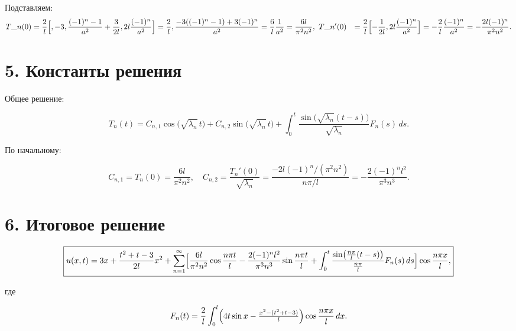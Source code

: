 \documentclass[a4paper,12pt]{article}
\begin{document}
Подставляем: \begin{align*} T\_n(0)&=\frac{2}{l}\Bigl[,-3,\frac{(-1)^n-1}{a^2} +\frac{3}{2l},2l\frac{(-1)^n}{a^2}\Bigr] =\frac{2}{l},\frac{-3((-1)^n-1)+3(-1)^n}{a^2} =\frac{6}{l}\frac{1}{a^2} =\frac{6l}{\pi^2n^2},\ T\_n'(0)&=\frac{2}{l}\Bigl[-\frac{1}{2l},2l\frac{(-1)^n}{a^2}\Bigr] =-\frac{2}{l}\frac{(-1)^n}{a^2} =-\frac{2l(-1)^n}{\pi^2n^2}. \end{align*}

\section*{5. Константы решения} Общее решение:

$$
  T_n(t)=C_{n,1}\cos\bigl(\sqrt{\lambda_n}\,t\bigr)
    +C_{n,2}\sin\bigl(\sqrt{\lambda_n}\,t\bigr)
    +\int_0^t\frac{\sin\bigl(\sqrt{\lambda_n}(t-s)\bigr)}{\sqrt{\lambda_n}}F_n(s)\,ds.
$$

По начальному:

$$
  C_{n,1}=T_n(0)=\frac{6l}{\pi^2n^2},
  \quad
  C_{n,2}=\frac{T_n'(0)}{\sqrt{\lambda_n}}
    =\frac{-2l(-1)^n/(\pi^2n^2)}{n\pi/l}
    =-\frac{2(-1)^n l^2}{\pi^3n^3}.
$$

\section*{6. Итоговое решение} 

$$
  \boxed{
  u(x,t)
  =3x+\frac{t^2+t-3}{2l}x^2
  +\sum_{n=1}^\infty
  \Bigl[
    \frac{6l}{\pi^2n^2}\cos\frac{n\pi t}{l}
    -\frac{2(-1)^n l^2}{\pi^3n^3}\sin\frac{n\pi t}{l}
    +\int_0^t\frac{\sin\bigl(\tfrac{n\pi}{l}(t-s)\bigr)}{\tfrac{n\pi}{l}}F_n(s)\,ds
  \Bigr]
  \cos\frac{n\pi x}{l},
  }
$$

где

$$
  F_n(t)=\frac{2}{l}\int_0^l
    \Bigl(4t\sin x-\tfrac{x^2-(t^2+t-3)}{l}\Bigr)
    \cos\frac{n\pi x}{l}\,dx.
$$
\end{document}
